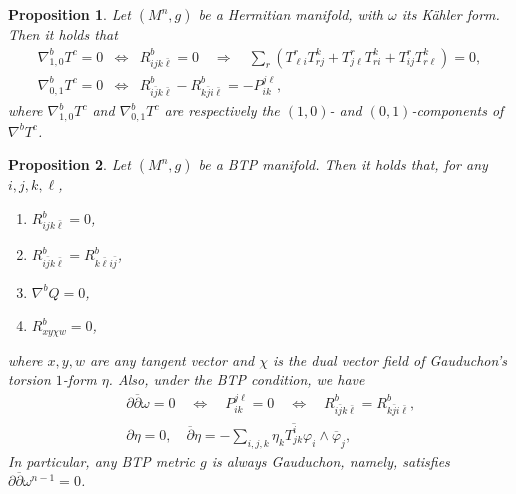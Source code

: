 \documentclass[10pt,a4paper]{amsart}
\newtheorem{proposition}{Proposition}
\begin{document}
\begin{proposition}\label{Tderivative}
Let $(M^n,g)$ be a Hermitian manifold, with $\omega$ its K\"ahler form.
Then it holds that
\begin{eqnarray}
\nabla^b_{1,0} T^c=0 & \Longleftrightarrow &
R^b_{ijk\bar{\ell}}=0\quad \Longrightarrow \quad \sum_r(T^r_{\ell i}T^k_{r j} + T^r_{j\ell}T^k_{ri} + T^r_{ij}T^k_{r \ell})=0,\label{parallel_10}\\
\nabla^b_{0,1} T^c=0 & \Longleftrightarrow &
R^b_{i \bar{j} k \bar{\ell}} - R^b_{k \bar{j} i \bar{\ell}} = -P_{ik}^{j \ell} \label{parallel_01},
\end{eqnarray}
where $\nabla^b_{1,0} T^c$ and $\nabla^b_{0,1} T^c$ are respectively the $(1,0)$- and $(0,1)$-components of $\nabla^bT^c$.
\end{proposition}

\begin{proposition} \label{prop3.6}
Let $(M^n,g)$ be a BTP manifold. Then it holds that, for any $i,j,k,\ell$,
\begin{enumerate}
\item\label{R20=0} $R^b_{ijk\bar{\ell}}=0$,
\item\label{R11_12=34} $R^b_{i \bar{j} k \bar{\ell}} = R^b_{k \bar{\ell} i \bar{j}}$,
\item\label{Q_pll} $\nabla^b Q=0$,
\item\label{R=0} $R^b_{xy \chi w}=0$,
\end{enumerate}
where $x,y,w$ are any tangent vector and $\chi$ is the dual vector field of Gauduchon's torsion $1$-form $\eta$.
Also, under the BTP condition, we have
\begin{eqnarray}
&& \partial \overline{\partial} \omega =0 \quad \Longleftrightarrow \quad   P_{ik}^{j \ell}=0  \quad \Longleftrightarrow \quad
R^b_{i \bar{j} k \bar{\ell}} = R^b_{k \bar{j} i \bar{\ell}}, \label{eq_plcld}\\
&& \partial \eta=0,\quad \overline{\partial} \eta = -\sum_{i,j,k}\eta_k \overline{T^i_{jk}} \varphi_i \wedge \overline{\varphi}_j,
\end{eqnarray}
In particular, any BTP metric $g$ is always Gauduchon, namely, satisfies $\partial \overline{\partial} \omega^{n-1}=0$.
\end{proposition}
\end{document}
